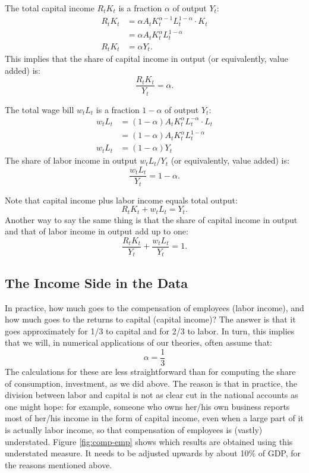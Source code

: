 \documentclass[]{book}
\theoremstyle{definition}
\theoremstyle{definition}
\theoremstyle{definition}
\theoremstyle{remark}
\begin{document}
The total capital income \(R_t K_t\) is a fraction \(\alpha\) of output
\(Y_t\): \[
\begin{aligned}
R_t K_t &= \alpha A_t K_t^{\alpha-1} L_t^{1-\alpha} \cdot K_t \\
&= \alpha A_t K_t^{\alpha} L_t^{1-\alpha}\\
R_t K_t &= \alpha Y_t.
\end{aligned}
\] This implies that the share of capital income in output (or
equivalently, value added) is: \[\boxed{\frac{R_t K_t}{Y_t}=\alpha}.\]

The total wage bill \(w_t L_t\) is a fraction \(1-\alpha\) of output
\(Y_t\): \[
\begin{aligned}
w_t L_t &= (1-\alpha) A_t K_t^{\alpha} L_t^{-\alpha} \cdot L_t \\
&= (1-\alpha) A_t K_t^{\alpha} L_t^{1-\alpha}\\
w_t L_t &= (1-\alpha) Y_t
\end{aligned}
\] The share of labor income in output \(w_t L_t/Y_t\) (or equivalently,
value added) is: \[\boxed{\frac{w_t L_t}{Y_t}=1-\alpha}.\]

Note that capital income plus labor income equals total output:
\[R_t K_t + w_t L_t = Y_t.\] Another way to say the same thing is that
the share of capital income in output and that of labor income in output
add up to one: \[\boxed{\frac{R_t K_t}{Y_t} + \frac{w_t L_t}{Y_t}=1}.\]

\subsection{The Income Side in the
Data}\label{the-income-side-in-the-data}

In practice, how much goes to the compensation of employees (labor
income), and how much goes to the returns to capital (capital income)?
The answer is that it goes approximately for 1/3 to capital and for 2/3
to labor. In turn, this implies that we will, in numerical applications
of our theories, often assume that: \[\alpha = \frac{1}{3}\] The
calculations for these are less straightforward than for computing the
share of consumption, investment, as we did above. The reason is that in
practice, the division between labor and capital is not as clear cut in
the national accounts as one might hope: for example, someone who owns
her/his own business reports most of her/his income in the form of
capital income, even when a large part of it is actually labor income,
so that compensation of employees is (vastly) understated. Figure
\ref{fig:comp-emp} shows which results are obtained using this
understated measure. It needs to be adjusted upwards by about 10\% of
GDP, for the reasons mentioned above.
\end{document}
